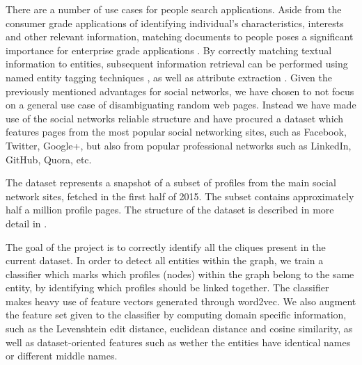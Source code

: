 There are a number of use cases for people search applications. Aside from the
consumer grade applications of identifying individual's characteristics, interests
and other relevant information, matching documents to people poses a significant
importance for enterprise grade applications \cite{balog2007people}. By correctly
matching textual information to entities, subsequent information retrieval
can be performed using named entity tagging techniques \cite{nadeau2007survey},
as well as attribute extraction \cite{surdeanu2005named}.
Given the previously mentioned advantages for social networks, we have chosen
to not focus on a general use case of disambiguating random web pages. Instead
we have made use of the social networks reliable structure and have procured
a dataset which features pages from the most popular social networking sites,
such as Facebook, Twitter, Google+, but also from popular professional networks
such as LinkedIn, GitHub, Quora, etc.

The dataset represents a snapshot of a subset of profiles from the main
social network sites, fetched in the first half of 2015. The subset contains
approximately half a million profile pages. The structure of the dataset
is described in more detail in .

The goal of the project is to correctly identify all the cliques present in the
current dataset. In order to detect all entities within the graph, we train a
classifier which marks which profiles (nodes) within the graph belong to the same
entity, by identifying which profiles should be linked together. The classifier
makes heavy use of feature vectors generated through word2vec. We also augment
the feature set given to the classifier by computing domain specific information,
such as the Levenshtein edit distance, euclidean distance and cosine similarity,
as well as dataset-oriented features such as wether the entities have identical
names or different middle names.
